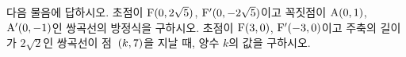 다음 물음에 답하시오.
 초점이 $\mathrm{F}(0{,}\mkern3mu\mathopen{}2\sqrt{5})$, $\mathrm{F}'(0{,}\mkern3mu\mathopen{}-2\sqrt{5})$이고 꼭짓점이 $\mathrm{A}(0{,}\mkern3mu\mathopen{}1)$, $\mathrm{A}'(0{,}\mkern3mu\mathopen{}-1)$인 쌍곡선의 방정식을 구하시오.
 초점이 $\mathrm{F}(3{,}\mkern3mu\mathopen{}0)$, $\mathrm{F}'(-3{,}\mkern3mu\mathopen{}0)$이고 주축의 길이가 $2\sqrt{2}$인 쌍곡선이 점~$(k{,}\mkern3mu\mathopen{}7)$을 지날 때, 양수 $k$의 값을 구하시오.
